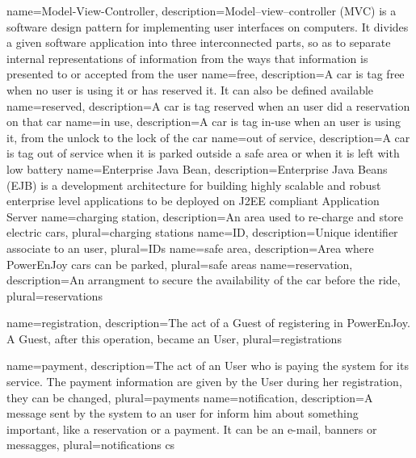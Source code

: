 
{
  name={Model-View-Controller},
  description={Model–view–controller (MVC) is a software design pattern for implementing user interfaces on computers. It divides a given software application into three interconnected parts, so as to separate internal representations of information from the ways that information is presented to or accepted from the user}
}
{
	name={free},
	description={A car is tag free when no user is using it or has reserved it. It can also be defined available}
}
{
	name={reserved},
	description={A car is tag reserved when an user did a reservation on that car}
}
{
	name={in use},
	description={A car is tag in-use when an user is using it, from the unlock to the lock of the car}
}
{
	name={out of service},
	description={A car is tag out of service when it is parked outside a safe area or when it is left with low battery}
}
{
  name={Enterprise Java Bean},
  description={Enterprise Java Beans (EJB) is a development architecture for building highly scalable and robust enterprise level applications to be deployed on J2EE compliant Application Server}
}
{
  name={charging station},
  description={An area used to re-charge and store electric cars},
  plural={charging stations}
}
{
  name={ID},
  description={Unique identifier associate to an user},
  plural={IDs}
}
{
  name={safe area},
  description={Area where PowerEnJoy cars can be parked},
  plural={safe areas}
}
{
  name={reservation},
  description={An arrangment to secure the availability of the car before the ride},
  plural={reservations}
}

{
	name={registration},
	description={The act of a Guest of registering in PowerEnJoy. A Guest, after this operation, became an User},
	plural={registrations}
}

{
	name={payment},
	description={The act of an User who is paying the system for its service. The payment information are given by the User during her \gls{registration}, they can be changed},
	plural={payments}
}
{
	name={notification},
	description={A message sent by the system to an user for inform him about something important, like a reservation or a payment. It can be an e-mail, banners or messagges},
	plural={notifications}
}
cs